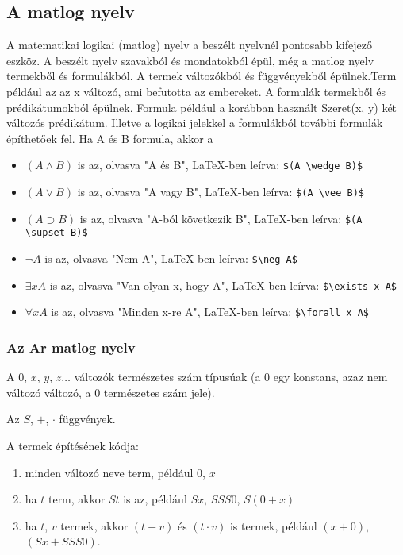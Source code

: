 \documentclass{article}
\begin{document}
\subsection{A matlog nyelv}

A matematikai logikai (matlog) nyelv a beszélt nyelvnél pontosabb kifejező eszköz. A beszélt nyelv szavakból és mondatokból épül, még a matlog nyelv termekből és formulákból. A termek változókból és függvényekből épülnek.Term például az az x változó, ami befutotta az embereket. A formulák termekből és prédikátumokból épülnek. Formula például a korábban használt Szeret(x, y) két változós prédikátum. Illetve a logikai jelekkel a formulákból további formulák építhetőek fel. Ha A és B formula, akkor a
\begin{itemize}
\item
$(A \wedge B)$ is az,  olvasva "A és B", \LaTeX -ben leírva: \verb!$(A \wedge B)$!

\item
$(A \vee B)$ is az,  olvasva "A vagy B", \LaTeX -ben leírva: \verb!$(A \vee B)$!
\item
$(A \supset B)$ is az,  olvasva "A-ból következik B", \LaTeX -ben leírva: \verb!$(A \supset B)$!
\item
$\neg A$ is az, olvasva "Nem A", \LaTeX -ben leírva: \verb!$\neg A$!
\item
$\exists x A$ is az,  olvasva "Van olyan x, hogy A", \LaTeX -ben leírva: \verb!$\exists x A$!
\item
$ \forall x A$ is az, olvasva "Minden x-re A", \LaTeX -ben leírva: \verb!$\forall x A$!
 \end{itemize}

\subsubsection{Az Ar matlog nyelv}

A $0$, $x$, $y$, $z \dots$ változók természetes szám típusúak (a 0 egy konstans, azaz nem változó változó, a 0 természetes szám jele).

Az $S$, $+$, $\cdot$ függvények. 

A termek építésének kódja:
\begin{enumerate}
\item
minden változó neve term, például $0$, $x$
\item
ha $t$ term, akkor $St$ is az, például $Sx$, $SSS0$, $S(0+x)$
\item
ha $t$, $v$ termek, akkor $(t+v)$ és $(t \cdot v)$ is termek, például $(x+0)$, $(Sx+SSS0)$.
 \end{enumerate}
\end{document}
